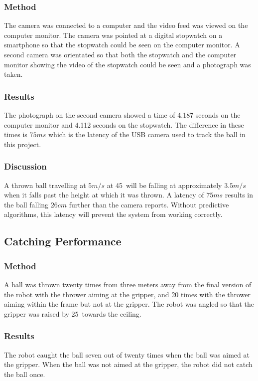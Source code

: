 \documentclass[conference]{IEEEtran}
\begin{document}
\subsubsection{Method}
The camera was connected to a computer and the video feed was viewed on the computer monitor. The camera was pointed at a digital stopwatch on a smartphone so that the stopwatch could be seen on the computer monitor. A second camera was orientated so that both the stopwatch and the computer monitor showing the video of the stopwatch could be seen and a photograph was taken. 
\subsubsection{Results}
The photograph on the second camera showed a time of 4.187 seconds on the computer monitor and 4.112 seconds on the stopwatch. The difference in these times is $75ms$ which is the latency of the USB camera used to track the ball in this project.

\subsubsection{Discussion}A thrown ball travelling at $5m/s$ at 45\degree\ will be falling at approximately $3.5m/s$ when it falls past the height at which it was thrown.  A latency of $75ms$ results in the ball falling $26cm$ further than the camera reports. Without predictive algorithms, this latency will prevent the system from working correctly.


\subsection{Catching Performance}
\subsubsection{Method}
A ball was thrown twenty times from three meters away from the final version of the robot with the thrower aiming at the gripper, and 20 times with the thrower aiming within the frame but not at the gripper. The robot was angled so that the gripper was raised by 25\degree\ towards the ceiling. 
\subsubsection{Results}
The robot caught the ball seven out of twenty times when the ball was aimed at the gripper. When the ball was not aimed at the gripper, the robot did not catch the ball once.
\end{document}
